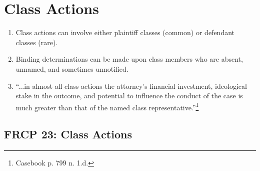 \section{Class Actions}

\begin{enumerate}
    \item Class actions can involve either plaintiff classes (common) or
    defendant classes (rare).
    \item Binding determinations can be made upon class members who are
    absent, unnamed, and sometimes unnotified.
    \item ``...in almost all class actions the attorney's financial
    investment, ideological stake in the outcome, and potential to influence
    the conduct of the case is much greater than that of the named class
    representative.''\footnote{Casebook p. 799 n. 1.d.}
\end{enumerate}

\subsection{FRCP 23: Class Actions}

